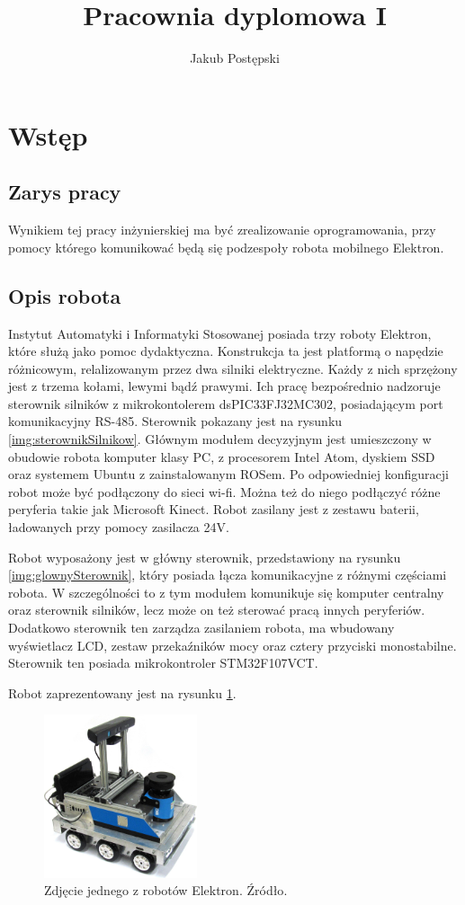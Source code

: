 \documentclass[a4paper, 12pt]{article}
\author{Jakub Postępski}
\title{Pracownia dyplomowa I}
\begin{document}
	\maketitle
	\section{Wstęp}
	\subsection{Zarys pracy}
	Wynikiem tej pracy inżynierskiej ma być zrealizowanie oprogramowania, przy pomocy którego komunikować będą się podzespoły robota mobilnego Elektron. 
	\subsection{Opis robota}
	Instytut Automatyki i Informatyki Stosowanej posiada trzy roboty Elektron, które służą jako pomoc dydaktyczna. Konstrukcja ta jest platformą o napędzie różnicowym, relalizowanym przez dwa silniki elektryczne. Każdy z nich sprzężony jest z trzema kołami, lewymi bądź prawymi. Ich pracę bezpośrednio nadzoruje sterownik silników z mikrokontolerem dsPIC33FJ32MC302, posiadającym port komunikacyjny RS-485. Sterownik pokazany jest na rysunku \ref{img:sterownikSilnikow}. Głównym modułem decyzyjnym jest umieszczony w obudowie robota komputer klasy PC, z procesorem Intel Atom, dyskiem SSD oraz systemem Ubuntu z zainstalowanym ROSem. Po odpowiedniej konfiguracji robot może być podłączony do sieci wi-fi. Można też do niego podłączyć różne peryferia takie jak Microsoft Kinect. Robot zasilany jest z zestawu baterii, ładowanych przy pomocy zasilacza 24V. \par
	Robot wyposażony jest w główny sterownik, przedstawiony na rysunku \ref{img:glownySterownik}, który posiada łącza komunikacyjne z różnymi częściami robota. W szczególności to z tym modułem komunikuje się komputer centralny oraz sterownik silników, lecz może on też sterować pracą innych peryferiów. Dodatkowo sterownik ten zarządza zasilaniem robota, ma wbudowany wyświetlacz LCD, zestaw przekaźników mocy oraz cztery przyciski monostabilne. Sterownik ten posiada mikrokontroler STM32F107VCT.\par
	Robot zaprezentowany jest na rysunku \ref{img:elektron}.
	\begin{figure}[ht]
	    \centering
	    \includegraphics[width=0.4\textwidth]{elektron}
	    \caption{Zdjęcie jednego z robotów Elektron. Źródło\cite{ElektronRobotyka}.}
	    \label{img:elektron}
	\end{figure}
\end{document}
